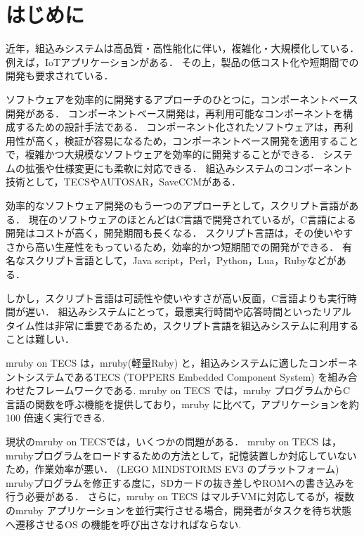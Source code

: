 \documentclass[submit]{ipsj_v2/UTF8/ipsj}
\begin{document}
\maketitle

\section{はじめに}
近年，組込みシステムは高品質・高性能化に伴い，複雑化・大規模化している．
例えば，IoTアプリケーションがある．
その上，製品の低コスト化や短期間での開発も要求されている．

ソフトウェアを効率的に開発するアプローチのひとつに，コンポーネントベース開発がある．
コンポーネントベース開発は，再利用可能なコンポーネントを構成するための設計手法である\cite{par:Crnkovic}．
コンポーネント化されたソフトウェアは，再利用性が高く，検証が容易になるため，コンポーネントベース開発を適用することで，複雑かつ大規模なソフトウェアを効率的に開発することができる．
システムの拡張や仕様変更にも柔軟に対応できる．
組込みシステムのコンポーネント技術として，TECS\cite{par:TECS}やAUTOSAR\cite{url:AUTOSAR}，SaveCCM\cite{par:SAVEapproach}がある．

効率的なソフトウェア開発のもう一つのアプローチとして，スクリプト言語がある．
現在のソフトウェアのほとんどはC言語で開発されているが，C言語による開発はコストが高く，開発期間も長くなる．
スクリプト言語は，その使いやすさから高い生産性をもっているため，効率的かつ短期間での開発ができる．
有名なスクリプト言語として，Java script，Perl，Python，Lua，Rubyなどがある．

しかし，スクリプト言語は可読性や使いやすさが高い反面，C言語よりも実行時間が遅い．
組込みシステムにとって，最悪実行時間や応答時間といったリアルタイム性は非常に重要であるため，スクリプト言語を組込みシステムに利用することは難しい．

mruby on TECS は，mruby(軽量Ruby) と，組込みシステムに適したコンポーネントシステムであるTECS (TOPPERS Embedded Component System) を組み合わせたフレームワークである\cite{par:mrubyonTECS}.
mruby on TECS では，mruby プログラムからC 言語の関数を呼ぶ機能を提供しており，mruby に比べて，アプリケーションを約100 倍速く実行できる.

現状のmruby on TECSでは，いくつかの問題がある．
mruby on TECS は，mrubyプログラムをロードするための方法として，記憶装置しか対応していないため，作業効率が悪い．
(LEGO MINDSTORMS EV3 のプラットフォーム\cite{par:EV3})
mrubyプログラムを修正する度に，SDカードの抜き差しやROMへの書き込みを行う必要がある．
さらに，mruby on TECS はマルチVMに対応してるが，複数のmruby アプリケーションを並行実行させる場合，開発者がタスクを待ち状態へ遷移させるOS の機能を呼び出さなければならない.
\end{document}
